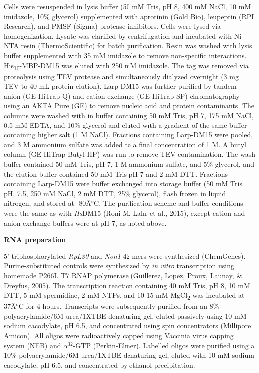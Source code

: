 \documentclass[12pt,oneside]{reedthesis}
\begin{document}
Cells were resuspended in lysis buffer (50 mM Tris, pH 8, 400 mM NaCl, 10 mM imidazole, 10\% glycerol) supplemented with aprotinin (Gold Bio), leupeptin (RPI Research), and PMSF (Sigma) protease inhibitors. Cells were lysed via homogenization. Lysate was clarified by centrifugation and incubated with Ni-NTA resin (ThermoScientific) for batch purification. Resin was washed with lysis buffer supplemented with 35 mM imidazole to remove non-specific interactions. His\textsubscript{10}-MBP-DM15 was eluted with 250 mM imidazole. The tag was removed via proteolysis using TEV protease and simultaneously dialyzed overnight (3 mg TEV to 40 mL protein elution). Larp-DM15 was further purified by tandem anion (GE HiTrap Q) and cation exchange (GE HiTrap SP) chromatography using an AKTA Pure (GE) to remove nucleic acid and protein contaminants. The columns were washed with in buffer containing 50 mM Tris, pH 7, 175 mM NaCl, 0.5 mM EDTA, and 10\% glycerol and eluted with a gradient of the same buffer containing higher salt (1 M NaCl). Fractions containing Larp-DM15 were pooled, and 3 M ammonium sulfate was added to a final concentration of 1 M. A butyl column (GE HiTrap Butyl HP) was run to remove TEV contamination. The wash buffer contained 50 mM Tris, pH 7, 1 M ammonium sulfate, and 5\% glycerol, and the elution buffer contained 50 mM Tris pH 7 and 2 mM DTT. Fractions containing Larp-DM15 were buffer exchanged into storage buffer (50 mM Tris pH, 7.5, 250 mM NaCl, 2 mM DTT, 25\% glycerol), flash frozen in liquid nitrogen, and stored at -80Â°C. The purification scheme and buffer conditions were the same as with \emph{Hs}DM15 (Roni M. Lahr et al., 2015), except cation and anion exchange buffers were at pH 7, as noted above.

\textbf{RNA preparation}

5'-triphosphorylated \emph{RpL30} and \emph{Non1} 42-mers were synthesized (ChemGenes). Purine-substituted controls were synthesized by \emph{in vitro} transcription using homemade P266L T7 RNAP polymerase (Guillerez, Lopez, Proux, Launay, \& Dreyfus, 2005). The transcription reaction containing 40 mM Tris, pH 8, 10 mM DTT, 5 mM spermidine, 2 mM NTPs, and 10-15 mM MgCl\textsubscript{2} was incubated at 37Â°C for 4 hours. Transcripts were subsequently purified from an 8\% polyacrylamide/6M urea/1XTBE denaturing gel, eluted passively using 10 mM sodium cacodylate, pH 6.5, and concentrated using spin concentrators (Millipore Amicon). All oligos were radioactively capped using Vaccinia virus capping system (NEB) and \(\alpha^{32}\)-GTP (Perkin-Elmer). Labelled oligos were purified using a 10\% polyacrylamide/6M urea/1XTBE denaturing gel, eluted with 10 mM sodium cacodylate, pH 6.5, and concentrated by ethanol precipitation.
\end{document}
